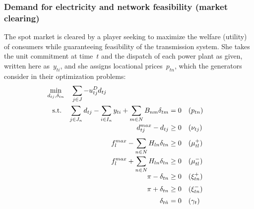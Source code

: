\documentclass[9pt,a4paper]{article}
\newcommand{\st}{\text{s.t.} \quad}
\begin{document}
\subsubsection*{Demand for electricity and network feasibility (market clearing)}
The spot market is cleared by a player seeking to maximize the welfare (utility) of consumers while guaranteeing feasibility of the transmission system. She takes the unit commitment at time~$t$ and the dispatch of each power plant as given, written here as~$y_{ti}$, and she assigns locational prices~$p_{tn}$, which the generators consider in their optimization problems:
\begin{subequations}\label{example:ISO:optimization}
\begin{align}
\min_{d_{tj}, \delta_{tn}} \quad \sum_{j \in J} - u^D_{tj} d_{tj} \hspace{3.8 cm} \label{example:ISO:optimization:objective} \\
\st \sum_{j \in J_n} d_{tj} - \sum_{i \in I_n} y_{ti} + \sum_{m \in N} B_{nm} \delta_{tm} = 0 &\quad (p_{tn}) \label{example:ISO:optimization:MBC} \\[-2 pt]
d^{max}_{tj} - d_{tj} \geq 0 &\quad (\nu_{tj}) \label{example:ISO:optimization:demand:max} \\[4 pt]
f^{max}_l - \sum_{n \in N} H_{ln} \delta_{tn} \geq 0 &\quad (\mu^+_{tl}) \label{example:ISO:optimization:flow:pos} \\[-2 pt]
f^{max}_l + \sum_{n \in N} H_{ln} \delta_{tn} \geq 0 &\quad (\mu^-_{tl})\label{example:ISO:optimization:flow:neg} \\[-4 pt]
\pi - \delta_{tn} \geq 0 &\quad (\xi^+_{tn}) \label{example:ISO:optimization:angle:pos} \\[2 pt]
\pi + \delta_{tn} \geq 0 &\quad (\xi^-_{tn}) \label{example:ISO:optimization:angle:neg} \\[2 pt]
\delta_{t\hat{n}} = 0  & \quad (\gamma_t) \label{example:ISO:slackbus}
\end{align}
\end{subequations}
\end{document}

